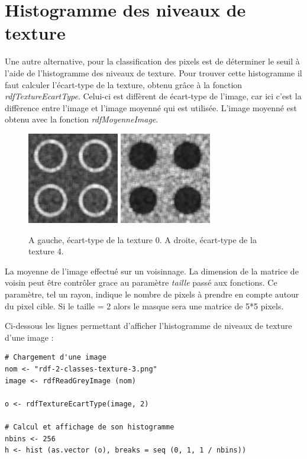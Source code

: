 \documentclass[11pt]{article}
\begin{document}
  \section{Histogramme des niveaux de texture}
  
  Une autre alternative, pour la classification des pixels est de déterminer le seuil à l'aide de 
  l'histogramme des niveaux de texture. Pour trouver cette histogramme il faut calculer l'écart-type de la texture,
  obtenu grâce à la fonction \textit{rdfTextureEcartType}. Celui-ci est diffèrent de écart-type de l'image, car ici 
  c'est la diffèrence entre l'image et l'image moyenné qui est utilisée. L'image moyenné est obtenu avec 
  la fonction \textit{rdfMoyenneImage}.\\
  
  \begin{figure}[H]
    \center
    \includegraphics[width=4cm]{texture-0/texture-0-5-ecart-type.png}
    \includegraphics[width=4cm]{texture-4/texture-4-5-ecart-type.png}
    \caption{A gauche, écart-type de la texture 0. A droite, écart-type de la texture 4.}
  \end{figure}
  
  La moyenne de l'image effectué sur un voisinnage. La dimension de la matrice de voisin peut être contrôler 
  grace au paramètre \textit{taille} passé aux fonctions. Ce paramètre, tel un rayon, indique le nombre de 
  pixels à prendre en compte autour du pixel cible. Si le taille = 2 alors le masque sera une matrice de 5*5 
  pixels.\\
  
  \newpage
  
  Ci-dessous les lignes permettant d'afficher l'histogramme de niveaux de texture d'une image :
  \begin{lstlisting}[caption=Afficher l'histogramme de niveaux de texture d'une image]
# Chargement d'une image
nom <- "rdf-2-classes-texture-3.png"
image <- rdfReadGreyImage (nom)

o <- rdfTextureEcartType(image, 2)

# Calcul et affichage de son histogramme
nbins <- 256
h <- hist (as.vector (o), breaks = seq (0, 1, 1 / nbins))\end{lstlisting}
  
\end{document}
